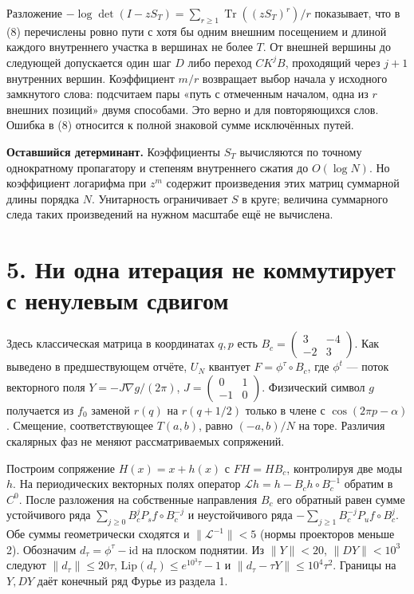 \documentclass[11pt,a4paper]{article}
\newcommand{\Tr}{\operatorname{Tr}}
\newcommand{\sect}[1]{\section*{\sffamily\color{ink}#1}}
\newcommand{\subt}[1]{\par\medskip\noindent\textbf{#1.}\quad}
\begin{document}
Разложение $-\log\det(I-zS_T)=\sum_{r\ge1}\Tr((zS_T)^r)/r$ показывает, что в (8) перечислены ровно пути с хотя бы одним внешним посещением и длиной каждого внутреннего участка в вершинах не более $T$. От внешней вершины до следующей допускается один шаг $D$ либо переход $CK^jB$, проходящий через $j+1$ внутренних вершин. Коэффициент $m/r$ возвращает выбор начала у исходного замкнутого слова: подсчитаем пары «путь с отмеченным началом, одна из $r$ внешних позиций» двумя способами. Это верно и для повторяющихся слов. Ошибка в (8) относится к полной знаковой сумме исключённых путей.

\subt{Оставшийся детерминант} Коэффициенты $S_T$ вычисляются по точному однократному пропагатору и степеням внутреннего сжатия до $O(\log N)$. Но коэффициент логарифма при $z^m$ содержит произведения этих матриц суммарной длины порядка $N$. Унитарность ограничивает $S$ в круге; величина суммарного следа таких произведений на нужном масштабе ещё не вычислена.
\newpage
\sect{5. Ни одна итерация не коммутирует с ненулевым сдвигом}
Здесь классическая матрица в координатах $q,p$ есть $B_c=\left(\begin{smallmatrix}3&-4\\-2&3\end{smallmatrix}\right)$. Как выведено в предшествующем отчёте, $U_N$ квантует $F=\phi^\tau\circ B_c$, где $\phi^t$ --- поток векторного поля $Y=-J\nabla g/(2\pi)$, $J=\left(\begin{smallmatrix}0&1\\-1&0\end{smallmatrix}\right)$. Физический символ $g$ получается из $f_0$ заменой $r(q)$ на $r(q+1/2)$ только в члене с $\cos(2\pi p-\alpha)$. Смещение, соответствующее $T(a,b)$, равно $(-a,b)/N$ на торе. Различия скалярных фаз не меняют рассматриваемых сопряжений.

Построим сопряжение $H(x)=x+h(x)$ с $F H=H B_c$, контролируя две моды $h$. На периодических векторных полях оператор $\mathcal L h=h-B_c h\circ B_c^{-1}$ обратим в $C^0$. После разложения на собственные направления $B_c$ его обратный равен сумме устойчивого ряда $\sum_{j\ge0} B_c^j P_s f\circ B_c^{-j}$ и неустойчивого ряда $-\sum_{j\ge1} B_c^{-j}P_u f\circ B_c^j$. Обе суммы геометрически сходятся и $\|\mathcal L^{-1}\|<5$ (нормы проекторов меньше 2). Обозначим $d_\tau=\phi^\tau-\mathrm{id}$ на плоском поднятии. Из $\|Y\|<20$, $\|DY\|<10^3$ следуют $\|d_\tau\|\le20\tau$, $\mathrm{Lip}(d_\tau)\le e^{10^3\tau}-1$ и $\|d_\tau-\tau Y\|\le10^4\tau^2$. Границы на $Y,DY$ даёт конечный ряд Фурье из раздела 1.
\end{document}
